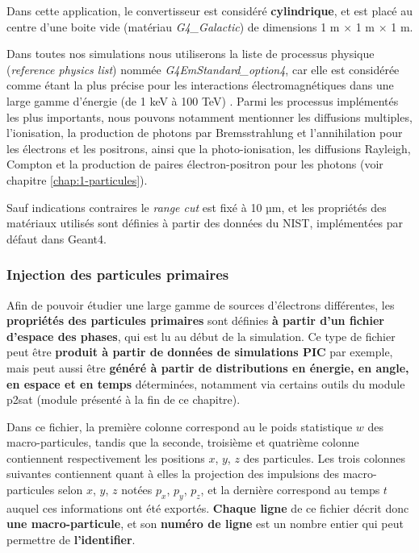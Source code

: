 \begin{refsection}
Dans cette application, le convertisseur est considéré \textbf{cylindrique}, et est placé au centre d'une boite vide (matériau \textit{G4\_Galactic}) de dimensions 1 m $\times$ 1 m $\times$ 1 m.

Dans toutes nos simulations nous utiliserons la liste de processus physique (\textit{reference physics list}) nommée \textit{G4EmStandard\_option4}, car elle est considérée comme étant la plus précise pour les interactions électromagnétiques dans une large gamme d'énergie (de 1 keV à 100 TeV) \parencite{geant4_physref}. Parmi les processus implémentés les plus importants, nous pouvons notamment mentionner les diffusions multiples, l'ionisation, la production de photons par Bremsstrahlung et l'annihilation pour les électrons et les positrons, ainsi que la photo-ionisation, les diffusions Rayleigh, Compton et la production de paires électron-positron pour les photons (voir chapitre \ref{chap:1-particules}).

Sauf indications contraires le \textit{range cut} est fixé à 10 µm, et les propriétés des matériaux utilisés sont définies à partir des données du NIST, implémentées par défaut dans Geant4.

\subsubsection{Injection des particules primaires}

Afin de pouvoir étudier une large gamme de sources d'électrons différentes, les \textbf{propriétés des particules primaires} sont définies \textbf{à partir d'un fichier d'espace des phases}, qui est lu au début de la simulation. Ce type de fichier peut être \textbf{produit à partir de données de simulations PIC} par exemple, mais peut aussi être \textbf{généré à partir de distributions en énergie, en angle, en espace et en temps} déterminées, notamment via certains outils du module p2sat (module présenté à la fin de ce chapitre).

Dans ce fichier, la première colonne correspond au le poids statistique $w$ des macro-particules, tandis que la seconde, troisième et quatrième colonne contiennent respectivement les positions $x$, $y$, $z$ des particules. Les trois colonnes suivantes contiennent quant à elles la projection des impulsions des macro-particules selon $x$, $y$, $z$ notées $p_x$, $p_y$, $p_z$, et la dernière correspond au temps $t$ auquel ces informations ont été exportés. \textbf{Chaque ligne} de ce fichier décrit donc \textbf{une macro-particule}, et son \textbf{numéro de ligne} est un nombre entier qui peut permettre de \textbf{l'identifier}.


\end{refsection}
